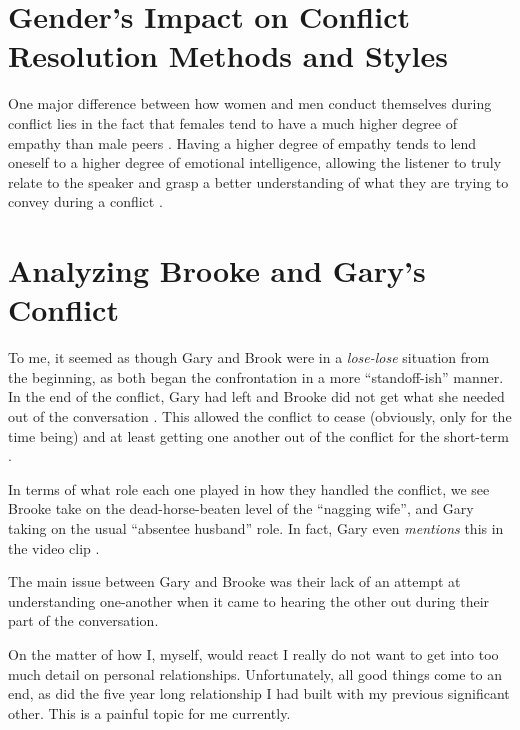 \documentclass[stu,12pt]{apa7}
\begin{document}
  \section{Gender's Impact on Conflict Resolution Methods and Styles}
    One major difference between how women and men conduct themselves during
      conflict lies in the fact that females tend to have a much higher degree
      of empathy than male peers \parencite[pp. 51]{wied_empathy_2007}. Having
      a higher degree of empathy tends to lend oneself to a higher degree of
      emotional intelligence, allowing the listener to truly relate to the
      speaker and grasp a better understanding of what they are trying to
      convey during a conflict \parencite[pp. 6]{morgan_he_2002}.


  \section{Analyzing Brooke and Gary's Conflict}
    To me, it seemed as though Gary and Brook were in a \textit{lose-lose}
      situation from the beginning, as both began the confrontation in a
      more ``standoff-ish'' manner. In the end of the conflict, Gary had left
      and Brooke did not get what she needed out of the conversation
      \parencite{reed_leaving_2006}. This allowed the conflict to cease
      (obviously, only for the time being) and at least getting one another
      out of the conflict for the short-term
      \parencite[pp. 5]{fisher_sources_2000}.

    In terms of what role each one played in how they handled the conflict, we
      see Brooke take on the dead-horse-beaten level of the ``nagging wife'',
      and Gary taking on the usual ``absentee husband'' role. In fact, Gary even
      \textit{mentions} this in the video clip \parencite{reed_leaving_2006}.

    The main issue between Gary and Brooke was their lack of an attempt at
      understanding one-another when it came to hearing the other out during
      their part of the conversation.

    On the matter of how I, myself, would react I really do not want to get into
      too much detail on personal relationships. Unfortunately, all good things
      come to an end, as did the five year long relationship I had built with
      my previous significant other. This is a painful topic for me currently.


  \newpage
  \printbibliography[%
    title={References},%
    heading={bibintoc},%
    notcategory={consulted}%
  ]

  \newpage
  \nocite{*}
  \printbibliography[%
    title={Additional References},%
    heading={bibintoc},%
    category={consulted}%
  ]
\end{document}
